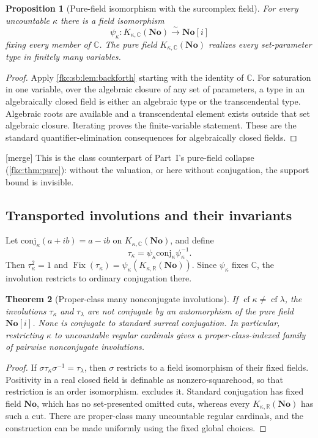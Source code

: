 \documentclass[11pt,letterpaper]{article}
\numberwithin{equation}{section}
\newtheorem{theorem}{Theorem}[section]
\newtheorem{proposition}[theorem]{Proposition}
\theoremstyle{definition}
\theoremstyle{remark}
\newcommand{\R}{\mathbb R}
\newcommand{\C}{\mathbb C}
\newcommand{\No}{\mathbf{No}}
\newcommand{\cf}{\operatorname{cf}}
\newcommand{\mergetag}{\textup{\textsf{\small[merge]}}}%
\newcommand{\SC}{\mathbf{No}[i]}
\newcommand{\Fix}{\operatorname{Fix}}
\newcommand{\conj}{\mathrm{conj}}
\newcommand{\KN}[2]{K_{#1,#2}(\No)}%
\begin{document}
\begin{proposition}[Pure-field isomorphism with the surcomplex field]\label{fkc:sb:prop:classiso}
For every uncountable $\kappa$ there is a field isomorphism
\[
 \psi_\kappa:\KN\kappa\C\overset{\sim}{\longrightarrow}\SC
\]
fixing every member of $\C$. The pure field $\KN\kappa\C$ realizes every set-parameter type in finitely many variables.
\end{proposition}
\begin{proof}
Apply \cref{fkc:sb:lem:backforth} starting with the identity of $\C$. For saturation in one variable, over the algebraic closure of any set of parameters, a type in an algebraically closed field is either an algebraic type or the transcendental type. Algebraic roots are available and a transcendental element exists outside that set algebraic closure. Iterating proves the finite-variable statement. These are the standard quantifier-elimination consequences for algebraically closed fields.
\end{proof}
\mergetag{} This is the class counterpart of Part~I's pure-field collapse (\cref{fkc:thm:pure}): without the valuation, or here without conjugation, the support bound is invisible.

\subsection{Transported involutions and their invariants}
Let $\conj_\kappa(a+ib)=a-ib$ on $\KN\kappa\C$, and define
\begin{equation}\label{fkc:sb:eq:tau}
 \tau_\kappa=\psi_\kappa\conj_\kappa\psi_\kappa^{-1}.
\end{equation}
Then $\tau_\kappa^2=1$ and $\Fix(\tau_\kappa)=\psi_\kappa(\KN\kappa\R)$. Since $\psi_\kappa$ fixes $\C$, the involution restricts to ordinary conjugation there.

\begin{theorem}[Proper-class many nonconjugate involutions]\label{fkc:sb:thm:involutions}
If $\cf\kappa\ne\cf\lambda$, the involutions $\tau_\kappa$ and $\tau_\lambda$ are not conjugate by an automorphism of the pure field $\SC$. None is conjugate to standard surreal conjugation. In particular, restricting $\kappa$ to uncountable regular cardinals gives a proper-class-indexed family of pairwise nonconjugate involutions.
\end{theorem}
\begin{proof}
If $\sigma\tau_\kappa\sigma^{-1}=\tau_\lambda$, then $\sigma$ restricts to a field isomorphism of their fixed fields. Positivity in a real closed field is definable as nonzero-squarehood, so that restriction is an order isomorphism.  excludes it. Standard conjugation has fixed field $\No$, which has no set-presented omitted cuts, whereas every $\KN\kappa\R$ has such a cut. There are proper-class many uncountable regular cardinals, and the construction can be made uniformly using the fixed global choices.
\end{proof}
\end{document}

